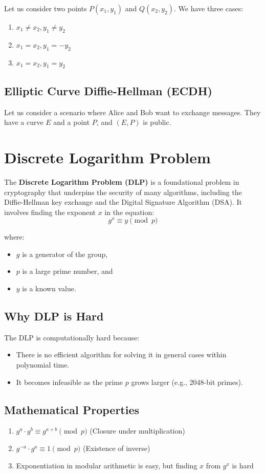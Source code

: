 \documentclass[11pt]{article}
\begin{document}
Let us consider two points $P(x_1, y_1)$ and $Q(x_2, y_2)$. We have three cases:
\begin{enumerate}
\item $x_1 \neq x_2, y_1 \neq y_2$
\item $x_1 = x_2, y_1 = -y_2$
\item $x_1 = x_2, y_1 = y_2$
\end{enumerate}

\subsection{Elliptic Curve Diffie-Hellman (ECDH)}
Let us consider a scenario where Alice and Bob want to exchange messages. They have a curve $E$ and a point $P$, and $(E, P)$ is public.

\section{Discrete Logarithm Problem}
The \textbf{Discrete Logarithm Problem (DLP)} is a foundational problem in cryptography that underpins the security of many algorithms, including the Diffie-Hellman key exchange and the Digital Signature Algorithm (DSA). It involves finding the exponent $x$ in the equation:
\[ g^x \equiv y \pmod{p} \]

where:
\begin{itemize}
\item $g$ is a generator of the group,
\item $p$ is a large prime number, and
\item $y$ is a known value.
\end{itemize}

\subsection{Why DLP is Hard}
The DLP is computationally hard because:
\begin{itemize}
\item There is no efficient algorithm for solving it in general cases within polynomial time.
\item It becomes infeasible as the prime $p$ grows larger (e.g., 2048-bit primes).
\end{itemize}

\subsection{Mathematical Properties}
\begin{enumerate}
\item $g^a \cdot g^b \equiv g^{a+b} \pmod{p}$ (Closure under multiplication)
\item $g^{-a} \cdot g^a \equiv 1 \pmod{p}$ (Existence of inverse)
\item Exponentiation in modular arithmetic is easy, but finding $x$ from $g^x$ is hard
\end{enumerate}
\end{document}
